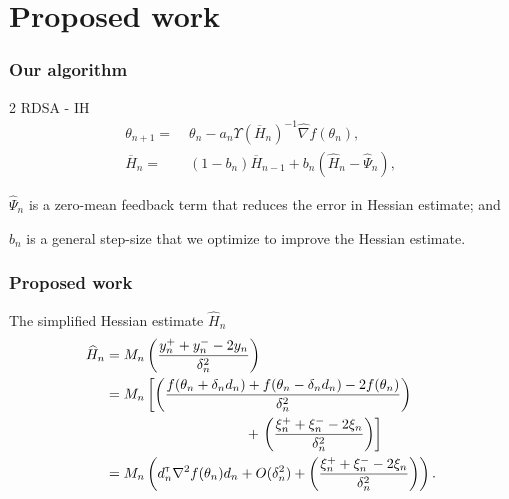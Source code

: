 \section{Proposed work}

\begin{frame}
\begin{small}
\frametitle{\centering Our algorithm}
\begin{block}{2 RDSA - IH}
\begin{align}
\label{eq:e2rdsa}
\theta_{n+1} = & \; \theta_n - a_n \Upsilon(\overline H_n)^{-1}\widehat\nabla f(\theta_n), \\
\overline H_n = & \; (1-b_{n})  \overline H_{n-1} + b_{n} ( \widehat H_n - \widehat \Psi_n),\label{eq:2rdsa-H}
\end{align}
\begin{inparaenum}[\bfseries (i)]
\item  $\widehat \Psi_n$ is a zero-mean feedback term that reduces the error in Hessian estimate; and\\
\item $b_n$ is a general step-size that we optimize to improve the Hessian estimate.
\end{inparaenum}
\end{block}
\end{small}
\end{frame}

\begin{frame}
\begin{small}
\frametitle{\centering Proposed work}
\begin{block}{The simplified Hessian estimate $\widehat H_n$} 
\begin{align}
\widehat H_n & = M_n \left(\dfrac{y_n^+ + y_n^- - 2 y_n}{\delta_n^2}\right) \nonumber \\
& =  M_n \left[\left(\dfrac{f(\theta_n+\delta_n d_n) + f(\theta_n-\delta_n d_n) - 2 f(\theta_n)}{\delta_n^2}\right) \right.\nonumber \\&\hspace{10em}+\left. \left(\dfrac{\xi_n^+ + \xi_n^- - 2 \xi_n}{\delta_n^2}\right)\right] \nonumber \\
& = M_n \left(d_n\tr \nabla^2 f(\theta_n) d_n +  O(\delta_n^2) + \left(\dfrac{\xi_n^+ + \xi_n^- - 2 \xi_n}{\delta_n^2} \right)\right).\label{eq:h0}
\end{align}
\end{block}
\end{small}
\end{frame}

